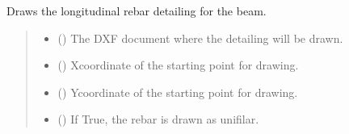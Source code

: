 \documentclass[a4paper,10pt,english]{sphinxmanual}
\begin{document}
\begin{fulllineitems}
\begin{fulllineitems}
\label{\detokenize{API:etacad.beam.Beam.draw_longitudinal_rebar_detailing}}
\pysigstartsignatures
{}
\pysigstopsignatures
\sphinxAtStartPar
Draws the longitudinal rebar detailing for the beam.
\begin{quote}\begin{description}
\begin{itemize}
\item {} 
\sphinxAtStartPar
{} () \textendash{} The DXF document where the detailing will be drawn.

\item {} 
\sphinxAtStartPar
{} (\sphinxstyleliteralemphasis{\sphinxupquote{, }}) \textendash{} X\sphinxhyphen{}coordinate of the starting point for drawing.

\item {} 
\sphinxAtStartPar
{} (\sphinxstyleliteralemphasis{\sphinxupquote{, }}) \textendash{} Y\sphinxhyphen{}coordinate of the starting point for drawing.

\item {} 
\sphinxAtStartPar
{} () \textendash{} If True, the rebar is drawn as unifilar.


\end{itemize}
\end{description}
\end{quote}
\end{fulllineitems}
\end{fulllineitems}
\end{document}
